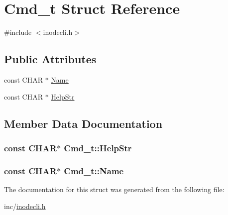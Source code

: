 \hypertarget{structCmd__t}{\section{Cmd\+\_\+t Struct Reference}
\label{structCmd__t}
}


{\ttfamily \#include $<$inodecli.\+h$>$}

\subsection*{Public Attributes}
\begin{DoxyCompactItemize}
\item 
const C\+H\+A\+R $\ast$ \hyperlink{structCmd__t_a3b98f5507e3c73782d6e643f34bd292d}{Name}
\item 
const C\+H\+A\+R $\ast$ \hyperlink{structCmd__t_a9508ec9ed99c99ccd34e3095c463e022}{Help\+Str}
\end{DoxyCompactItemize}


\subsection{Member Data Documentation}
\hypertarget{structCmd__t_a9508ec9ed99c99ccd34e3095c463e022}{
\subsubsection[{Help\+Str}]{\setlength{\rightskip}{0pt plus 5cm}const C\+H\+A\+R$\ast$ Cmd\+\_\+t\+::\+Help\+Str}}\label{structCmd__t_a9508ec9ed99c99ccd34e3095c463e022}
\hypertarget{structCmd__t_a3b98f5507e3c73782d6e643f34bd292d}{
\subsubsection[{Name}]{\setlength{\rightskip}{0pt plus 5cm}const C\+H\+A\+R$\ast$ Cmd\+\_\+t\+::\+Name}}\label{structCmd__t_a3b98f5507e3c73782d6e643f34bd292d}


The documentation for this struct was generated from the following file\+:\begin{DoxyCompactItemize}
\item 
inc/\hyperlink{inodecli_8h}{inodecli.\+h}\end{DoxyCompactItemize}

